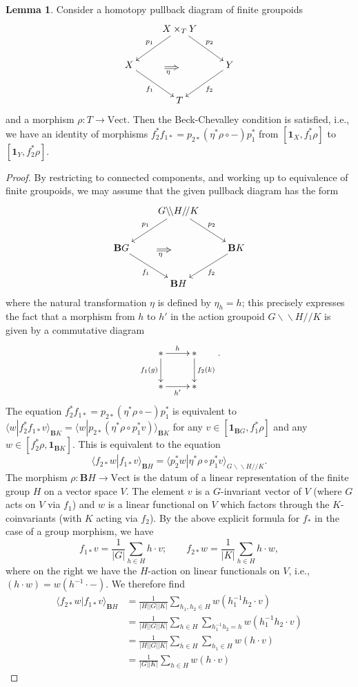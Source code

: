 \documentclass[12pt]{scrartcl}
\theoremstyle{definition}
\newtheorem{lemma}[definition]{Lemma}
\numberwithin{equation}{section}
\numberwithin{definition}{section}
\numberwithin{figure}{section}
\begin{document}
\begin{lemma}
\label{lem:BeckChevalley}
Consider a homotopy pullback diagram of finite groupoids
\[
\xymatrix{
& X\times_TY\ar[dl]_{p_1}\ar[dr]^{p_2}\\
X\ar[dr]_{f_1}&& Y\ar[dl]^{f_2}
\\& T
\ar@{=>}_{\eta\phantom{m}}(13,-14);(18,-14)
}
\]
and a morphism $\rho\colon T\to \mathrm{Vect}$.
Then the Beck-Chevalley condition is satisfied, i.e., we have an identity of morphisms $f_2^*f_{1*}=p_{2*}(\eta^*\rho\circ-)p_1^*$ from $[\mathbf{1}_X,f_1^*\rho]$ to $[\mathbf{1}_Y,f_2^*\rho]$.
\end{lemma}

\begin{proof}
By restricting to connected components, and working up to equivalence of finite groupoids, we may assume that the given pullback diagram has the form
\[
\xymatrix{
& G\backslash\!\backslash H/\!/K\ar[dl]_{p_1}\ar[dr]^{p_2}\\
\mathbf{B}G\ar[dr]_{f_1}&& \mathbf{B}K\ar[dl]^{f_2}
\\& \mathbf{B}H
\ar@{=>}_{\eta\phantom{m}}(13,-14);(18,-14)
}
\]
where the natural transformation $\eta$ is defined by $\eta_h=h$; this precisely expresses the fact that a morphism from $h$ to $h'$ in the action groupoid  $G\backslash\!\backslash H/\!/K$ is given by a commutative diagram
\[
\xymatrix{
\ast\ar[r]^{h}\ar[d]_{f_1(g)}&\ast\ar[d]^{f_2(k)}\\
\ast\ar[r]_{h'}&\ast
}.
\]
The equation $f_2^*f_{1*}=p_{2*}(\eta^*\rho\circ-)p_1^*$ is equivalent to $\langle w| f_2^*f_{1*}v\rangle_{\mathbf{B}K} = \langle w|p_{2*}(\eta^*\rho\circ p_1^*v)\rangle_{\mathbf{B}K}$ for any $v\in [\mathbf{1}_{\mathbf{B}G},f_1^*\rho]$ and any $w\in [f_2^*\rho,\mathbf{1}_{\mathbf{B}K}]$. This is equivalent to the equation
\[
\langle f_{2*}w| f_{1*}v\rangle_{\mathbf{B}H} = \langle p_2^*w|\eta^*\rho\circ p_1^*v\rangle_{G\backslash\!\backslash H/\!/K}.
\]
The morphism $\rho\colon \mathbf{B}H\to \mathrm{Vect}$ is the datum of a linear representation of the finite group $H$ on a vector space $V$. The element $v$ is a $G$-invariant vector of $V$ (where $G$ acts on $V$ via $f_1$) and $w$ is a linear functional on $V$ which factors through the $K$-coinvariants (with $K$ acting via $f_2$). By the above explicit formula for $f_*$ in the case of a group morphism, we have
\[
f_{1*}v=\frac{1}{|G|}\sum_{h\in H} h\cdot v;\qquad f_{2*}w=\frac{1}{|K|}\sum_{h\in H} h\cdot w,
\]
where on the right we have the $H$-action on linear functionals on $V$, i.e., $(h\cdot w)= w(h^{-1}\cdot -)$. We therefore find
\begin{align*}
\langle f_{2*}w| f_{1*}v\rangle_{\mathbf{B}H}&=\frac{1}{|H||G||K|}\sum_{h_1,h_2\in H}w(h_1^{-1}h_2\cdot v)\\
&=\frac{1}{|H||G||K|}\sum_{h\in H}\sum_{h_1^{-1}h_2=h}w(h_1^{-1}h_2\cdot v)\\
&=\frac{1}{|H||G||K|}\sum_{h\in H}\sum_{h_1\in H}w(h\cdot v)\\
&=\frac{1}{|G||K|}\sum_{h\in H}w(h\cdot v)
\end{align*}


\end{proof}
\end{document}

